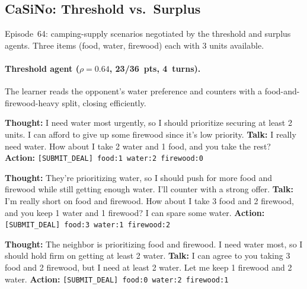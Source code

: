 \documentclass[11pt]{article}
\begin{document}
\subsection{CaSiNo: Threshold vs.\ Surplus}

Episode~64: camping-supply scenarios negotiated by the threshold and surplus agents. Three items (food, water, firewood) each with 3 units available.

\paragraph{Threshold agent ($\rho = 0.64$, 23/36~pts, 4~turns).} The learner reads the opponent's water preference and counters with a food-and-firewood-heavy split, closing efficiently.

\begin{neighborbox}
\textbf{Thought:} I need water most urgently, so I should prioritize securing at least 2 units. I can afford to give up some firewood since it's low priority.\newline
\textbf{Talk:} I really need water. How about I take 2 water and 1 food, and you take the rest?\newline
\textbf{Action:} \texttt{[SUBMIT\_DEAL] food:1 water:2 firewood:0}
\end{neighborbox}

\begin{camperbox}
\textbf{Thought:} They're prioritizing water, so I should push for more food and firewood while still getting enough water. I'll counter with a strong offer.\newline
\textbf{Talk:} I'm really short on food and firewood. How about I take 3 food and 2 firewood, and you keep 1 water and 1 firewood? I can spare some water.\newline
\textbf{Action:} \texttt{[SUBMIT\_DEAL] food:3 water:1 firewood:2}
\end{camperbox}

\begin{neighborbox}
\textbf{Thought:} The neighbor is prioritizing food and firewood. I need water most, so I should hold firm on getting at least 2 water.\newline
\textbf{Talk:} I can agree to you taking 3 food and 2 firewood, but I need at least 2 water. Let me keep 1 firewood and 2 water.\newline
\textbf{Action:} \texttt{[SUBMIT\_DEAL] food:0 water:2 firewood:1}
\end{neighborbox}
\end{document}
